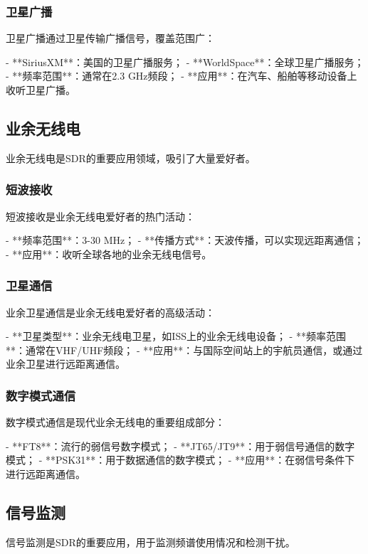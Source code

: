 ﻿\documentclass[UTF8]{ctexbook}
\begin{document}
\subsubsection{卫星广播}

卫星广播通过卫星传输广播信号，覆盖范围广：

- **SiriusXM**：美国的卫星广播服务；
- **WorldSpace**：全球卫星广播服务；
- **频率范围**：通常在2.3 GHz频段；
- **应用**：在汽车、船舶等移动设备上收听卫星广播。

\subsection{业余无线电}

业余无线电是SDR的重要应用领域，吸引了大量爱好者。

\subsubsection{短波接收}

短波接收是业余无线电爱好者的热门活动：

- **频率范围**：3-30 MHz；
- **传播方式**：天波传播，可以实现远距离通信；
- **应用**：收听全球各地的业余无线电信号。

\subsubsection{卫星通信}

业余卫星通信是业余无线电爱好者的高级活动：

- **卫星类型**：业余无线电卫星，如ISS上的业余无线电设备；
- **频率范围**：通常在VHF/UHF频段；
- **应用**：与国际空间站上的宇航员通信，或通过业余卫星进行远距离通信。

\subsubsection{数字模式通信}

数字模式通信是现代业余无线电的重要组成部分：

- **FT8**：流行的弱信号数字模式；
- **JT65/JT9**：用于弱信号通信的数字模式；
- **PSK31**：用于数据通信的数字模式；
- **应用**：在弱信号条件下进行远距离通信。

\subsection{信号监测}

信号监测是SDR的重要应用，用于监测频谱使用情况和检测干扰。
\end{document}
